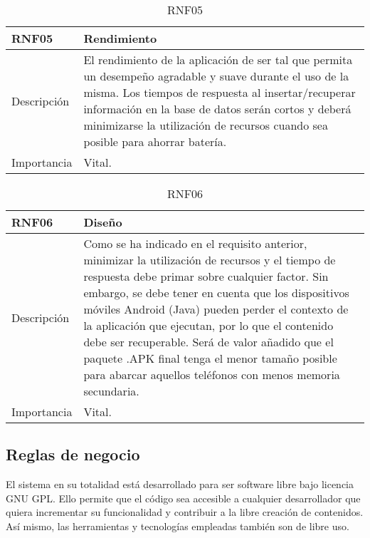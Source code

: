 \begin{table}[H]
\label{RNF05}
\begin{center}
\begin{tabular}{| l | p{10cm} |}
\hline
RNF05 & Rendimiento\\
\hline
Descripción & El rendimiento de la aplicación de ser tal que permita un desempeño agradable y suave durante el uso de la misma. Los tiempos de respuesta al insertar/recuperar información en la base de datos serán cortos y deberá minimizarse la utilización de recursos cuando sea posible para ahorrar batería.\\
\hline
Importancia & Vital.\\
\hline
\end{tabular}
\end{center}
\caption{RNF05}
\end{table}

\begin{table}[H]
\label{RNF06}
\begin{center}
\begin{tabular}{| l | p{10cm} |}
\hline
RNF06 & Diseño\\
\hline
Descripción & Como se ha indicado en el requisito anterior, minimizar la utilización de recursos y el tiempo de respuesta debe primar sobre cualquier factor. Sin embargo, se debe tener en cuenta que los dispositivos móviles Android (Java) pueden perder el contexto de la aplicación que ejecutan, por lo que el contenido debe ser recuperable. Será de valor añadido que el paquete .APK final tenga el menor tamaño posible para abarcar aquellos teléfonos con menos memoria secundaria.\\
\hline
Importancia & Vital.\\
\hline
\end{tabular}
\end{center}
\caption{RNF06}
\end{table}

\subsection{Reglas de negocio}

El sistema en su totalidad está desarrollado para ser software libre bajo licencia GNU GPL. Ello permite que el código sea accesible a cualquier desarrollador que quiera incrementar su funcionalidad y contribuir a la libre creación de contenidos. Así mismo, las herramientas y tecnologías empleadas también son de libre uso.

